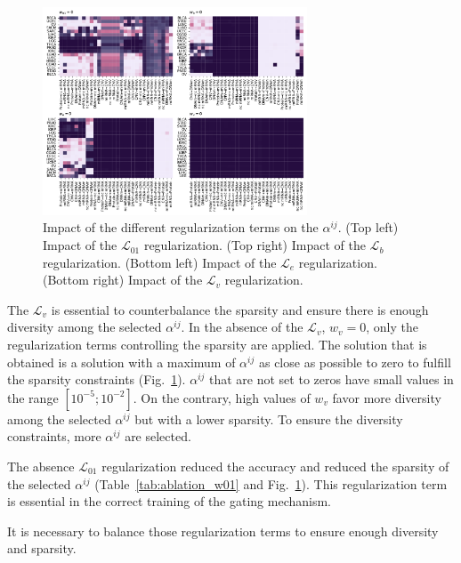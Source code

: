 \documentclass[../main.tex]{subfiles}
\begin{document}
     \begin{figure}
         \centering
         \includegraphics[width=0.7\textwidth]{ablation_heatmaps.pdf}
         \caption{Impact of the different regularization terms on the \(\alpha^{ij}\). (Top left) Impact of the \(\mathcal{L}_{01}\) regularization. (Top right) Impact of the \(\mathcal{L}_{b}\) regularization. (Bottom left) Impact of the \(\mathcal{L}_{e}\) regularization. (Bottom right) Impact of the \(\mathcal{L}_{v}\) regularization.}
         \label{fig:alphas_signature_ablation}
     \end{figure}

     The \(\mathcal{L}_v\) is essential to counterbalance the sparsity and ensure there is enough diversity among the selected \(\alpha^{ij}\).
     In the absence of the \(\mathcal{L}_v\), \(w_v = 0\), only the regularization terms controlling the sparsity are applied.
     The solution that is obtained is a solution with a maximum of \(\alpha^{ij}\)  as close as possible to zero to fulfill the sparsity constraints (Fig.~\ref{fig:alphas_signature_ablation}).
     \(\alpha^{ij}\) that are not set to zeros have small values in the range \(\left[10^{-5}; 10^{-2}\right]\).
     On the contrary, high values of \(w_v\) favor more diversity among the selected \(\alpha^{ij}\) but with a lower sparsity.
     To ensure the diversity constraints, more \(\alpha^{ij}\) are selected.

     The absence \(\mathcal{L}_{01}\) regularization reduced the accuracy and reduced the sparsity of the selected \(\alpha^{ij}\) (Table~\ref{tab:ablation_w01} and Fig.~\ref{fig:alphas_signature_ablation}).
     This regularization term is essential in the correct training of the gating mechanism.

     It is necessary to balance those regularization terms to ensure enough diversity and sparsity.
\end{document}
